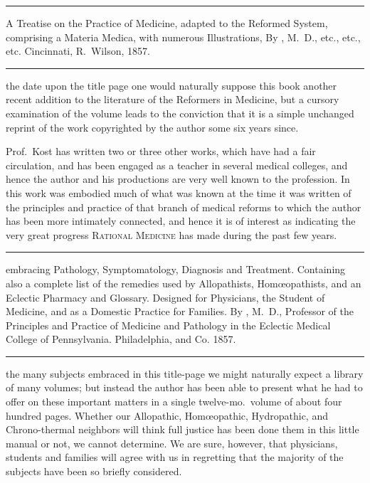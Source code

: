 
\fancybreak{* * *}

\footnotesize
{}  A Treatise on the Practice of Medicine, adapted to the Reformed
System, comprising a Materia Medica, with numerous Illustrations, By , M.~D., etc., etc., etc. Cincinnati, R.~Wilson, 1857.
\plainbreak{1}
\normalsize

 the date upon the title page one would naturally suppose this
book another recent addition to the literature of the Reformers in Medicine,
but a cursory examination of the volume leads to the conviction
that it is a simple unchanged reprint of the work copyrighted by the
author some six years since.

Prof.\ Kost has written two or three other works, which have had
a fair circulation, and has been engaged as a teacher in several
medical colleges, and hence the author and his productions are very
well known to the profession. In this work was embodied much of what
was known at the time it was written of the principles and practice of
that branch of medical reforms to which the author has been more intimately
connected, and hence it is of interest as indicating the very
great progress \textsc{Rational Medicine} has made during the past few years.

\fancybreak{* * *}

\footnotesize
{} embracing Pathology, Symptomatology,
Diagnosis and Treatment. Containing also a complete list of the remedies used
by Allopathists, Homœopathists, and an Eclectic Pharmacy and Glossary. Designed
for Physicians, the Student of Medicine, and as a Domestic Practice for Families. By
, M.~D., Professor of the Principles and Practice of Medicine and Pathology
in the Eclectic Medical College of Pennsylvania. Philadelphia, 
and Co. 1857.
\plainbreak{1}
\normalsize

 the many subjects embraced in this title-page we might naturally
expect a library of many volumes; but instead the author has been
able to present what he had to offer on these important matters in a
single twelve-mo.\ volume of about four hundred pages. Whether our
Allopathic, Homœopathic, Hydropathic, and Chrono-thermal neighbors
will think full justice has been done them in this little manual or not,
we cannot determine. We are sure, however, that physicians, students
and families will agree with us in regretting that the majority of the
subjects have been so briefly considered.

